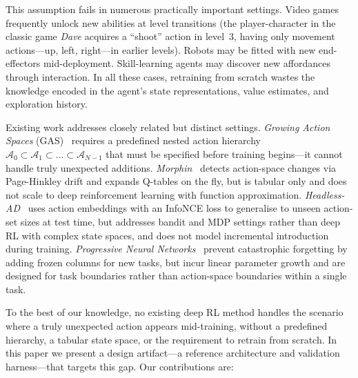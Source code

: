 \documentclass{article}
\begin{document}
This assumption fails in numerous practically important settings. Video games frequently unlock new abilities at level transitions (the player-character in the classic game \textit{Dave} acquires a ``shoot'' action in level~3, having only movement actions---up, left, right---in earlier levels). Robots may be fitted with new end-effectors mid-deployment. Skill-learning agents may discover new affordances through interaction. In all these cases, retraining from scratch wastes the knowledge encoded in the agent's state representations, value estimates, and exploration history.

Existing work addresses closely related but distinct settings. \emph{Growing Action Spaces} (GAS)~\cite{farquhar2020growing} requires a predefined nested action hierarchy $\mathcal{A}_0 \subset \mathcal{A}_1 \subset \dots \subset \mathcal{A}_{N-1}$ that must be specified before training begins---it cannot handle truly unexpected additions. \emph{Morphin}~\cite{delarosa2026morphin} detects action-space changes via Page-Hinkley drift and expands Q-tables on the fly, but is tabular only and does not scale to deep reinforcement learning with function approximation. \emph{Headless-AD}~\cite{sinii2023headless} uses action embeddings with an InfoNCE loss to generalise to unseen action-set sizes at test time, but addresses bandit and MDP settings rather than deep RL with complex state spaces, and does not model incremental introduction during training. \emph{Progressive Neural Networks}~\cite{rusu2016progressive} prevent catastrophic forgetting by adding frozen columns for new tasks, but incur linear parameter growth and are designed for task boundaries rather than action-space boundaries within a single task.

To the best of our knowledge, no existing deep RL method handles the scenario where a truly unexpected action appears mid-training, without a predefined hierarchy, a tabular state space, or the requirement to retrain from scratch. In this paper we present a design artifact---a reference architecture and validation harness---that targets this gap. Our contributions are:
\end{document}
